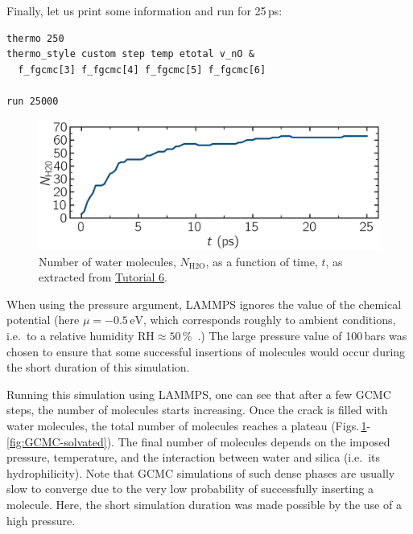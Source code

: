 \documentclass[9pt,tutorial]{livecoms}
\begin{document}
Finally, let us print some information and run for 25\,ps:
\begin{lstlisting}
thermo 250
thermo_style custom step temp etotal v_nO &
  f_fgcmc[3] f_fgcmc[4] f_fgcmc[5] f_fgcmc[6]

run 25000
\end{lstlisting}

\begin{figure}
\centering
\includegraphics[width=\linewidth]{GCMC-number}
\caption{Number of water molecules, $N_\text{H2O}$, as a function of time, $t$,
as extracted from \hyperref[gcmc-silica-label]{Tutorial 6}.}
\label{fig:GCMC-number}
\end{figure}

\begin{note}
When using the pressure argument, LAMMPS ignores the value of the
chemical potential (here $\mu = -0.5\,\text{eV}$, which corresponds roughly to
ambient conditions, i.e.~to a relative humidity $\text{RH} \approx 50\,\%$~\cite{gravelle2020multi}.)
The large pressure value of 100\,bars was chosen to ensure that some successful
insertions of molecules would occur during the short duration of this simulation.
\end{note}

Running this simulation using LAMMPS, one can see that
after a few GCMC steps, the number of molecules starts increasing.  Once the
crack is filled with water molecules, the total number of molecules reaches a plateau
(Figs.\,\ref{fig:GCMC-number}-\ref{fig:GCMC-solvated}).  The final number of
molecules depends on the imposed pressure, temperature, and the interaction
between water and silica (i.e.~its hydrophilicity).  Note that GCMC simulations
of such dense phases are usually slow to converge due to the very low probability
of successfully inserting a molecule.  Here, the short simulation duration was
made possible by the use of a high pressure.
\end{document}
